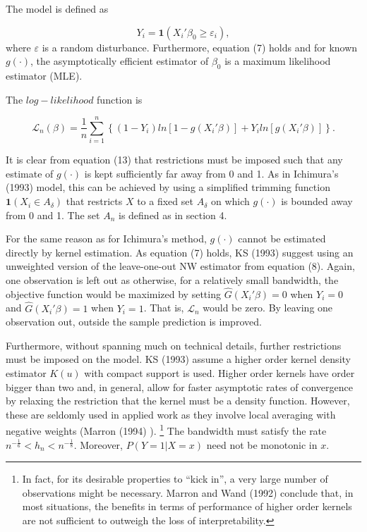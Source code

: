 \documentclass[a4paper]{article}
\begin{document}
The model is defined as

\begin{equation}
Y_i =  \mathbf{1}{(X_i'\beta_0 \geq \varepsilon_i)},
\end{equation}
where $\varepsilon$ is a random disturbance. Furthermore, equation (7) holds and for known $g(\cdot)$, the asymptotically efficient estimator of $\beta_0$ is a maximum likelihood estimator (MLE). 

The $log-likelihood$ function is

\begin{equation}
\mathcal{L}_n(\beta) = \frac{1}{n}\sum_{i=1}^n \left\{ (1 - Y_i)ln[ 1 - g(X_i'\beta)] + Y_iln[g(X_i'\beta)] \right\}.
\end{equation}

It is clear from equation (13) that restrictions must be imposed such that any estimate of $g(\cdot)$ is kept sufficiently far away from 0 and 1. As in Ichimura's (1993) \cite{[6]} model, this can be achieved by using a simplified trimming function $\mathbf{1}{(X_i \in A_\delta)}$ that restricts $X$ to a fixed set $A_\delta$ on which $g(\cdot)$ is bounded away from 0 and 1. The set $A_n$ is defined as in section 4.

For the same reason as for Ichimura's method, $g(\cdot)$ cannot be estimated directly by kernel estimation. As equation (7) holds, KS (1993) \cite{[12]} suggest using an unweighted version of the leave-one-out NW estimator from equation (8). Again, one observation is left out as otherwise, for a relatively small bandwidth, the objective function would be maximized by setting $\hat{G}(X_i'\beta)=0$ when $Y_i=0$ and $\hat{G}(X_i'\beta)=1$ when $Y_i=1$. That is, $\mathcal{L}_n$ would be zero. By leaving one observation out, outside the sample prediction is improved. 

Furthermore, without spanning much on technical details, further restrictions must be imposed on the model. KS (1993) \cite{[12]} assume a higher order kernel density estimator $K(u)$ with compact support is used. Higher order kernels have order bigger than two and, in general, allow for faster asymptotic rates of convergence by relaxing the restriction that the kernel must be a density function. However, these are seldomly used in applied work as they involve local averaging with negative weights (Marron (1994) \cite{[23]}). \footnote{ In fact, for its desirable properties to ``kick in'', a very large number of observations might be necessary. Marron and Wand (1992) \cite{[24]} conclude that, in most situations, the benefits in terms of performance of higher order kernels are not sufficient to outweigh the loss of interpretability.}
The bandwidth must satisfy the rate $ n^{-\frac{1}{6}} < h_n < n^{-\frac{1}{8}}$. Moreover, $P(Y=1|X=x)$ need not be monotonic in $x$.
\end{document}

